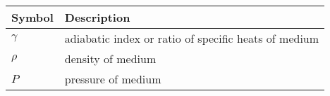 \begin{tabular}{ | m{1.0cm} | m{4cm} | } 
  \hline
 Symbol & Description \\ 
 \hline
 $\gamma$ & adiabatic index or ratio of specific heats of medium  \\
 \hline
$\rho$& density of medium\\
\hline
$P $& pressure of medium \\
\hline
\end{tabular}\\
\caption{}
\label{Table:1}